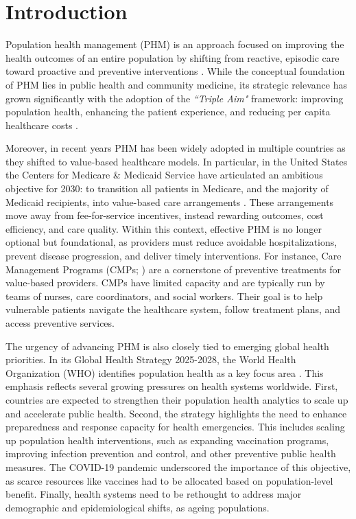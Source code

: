 \documentclass[12pt,a4paper]{article}
\begin{document}
	\section{Introduction \label{sec:introduction}}
	
		
Population health management (PHM) is an approach focused on improving the health outcomes of an entire population by shifting from reactive, episodic care toward proactive and preventive interventions \citep{PHM, PHM_def}. While the conceptual foundation of PHM lies in public health and community medicine, its strategic relevance has grown significantly with the adoption of the {\it ``Triple Aim"} framework: improving population health, enhancing the patient experience, and reducing per capita healthcare costs \citep{TripleAim}.

Moreover, in recent years PHM has been widely adopted in multiple countries as they shifted to value-based healthcare models. In particular, in the United States the Centers for Medicare \& Medicaid Service have articulated an ambitious objective for 2030: to transition all patients in Medicare, and the majority of Medicaid recipients, into value-based care arrangements \citep{CMS2030}. These arrangements move away from fee-for-service incentives, instead rewarding outcomes, cost efficiency, and care quality. Within this context, effective PHM is no longer optional but foundational, as providers must reduce avoidable hospitalizations, prevent disease progression, and deliver timely interventions. For instance, Care Management Programs (CMPs; \cite{gawande2011}) are a cornerstone of preventive treatments for value-based providers. CMPs have limited capacity and are typically run by teams of nurses, care coordinators, and social workers. Their goal is to help vulnerable patients navigate the healthcare system, follow treatment plans, and access preventive services. %

The urgency of advancing PHM is also closely tied to emerging global health priorities. In its Global Health Strategy 2025-2028, the World Health Organization (WHO) identifies population health as a key focus area \citep{WHO2025}. This emphasis reflects several growing pressures on health systems worldwide. First, countries are expected to strengthen their population health analytics to scale up and accelerate public health.  Second, the strategy highlights the need to enhance preparedness and response capacity for health emergencies. This includes scaling up population health interventions, such as expanding vaccination programs, improving infection prevention and control, and other preventive public health measures. The COVID-19 pandemic underscored the importance of this objective, as scarce resources like vaccines had to be allocated based on population-level benefit. Finally, health systems need to be rethought to address major demographic and epidemiological shifts, as ageing populations. %
\end{document}
